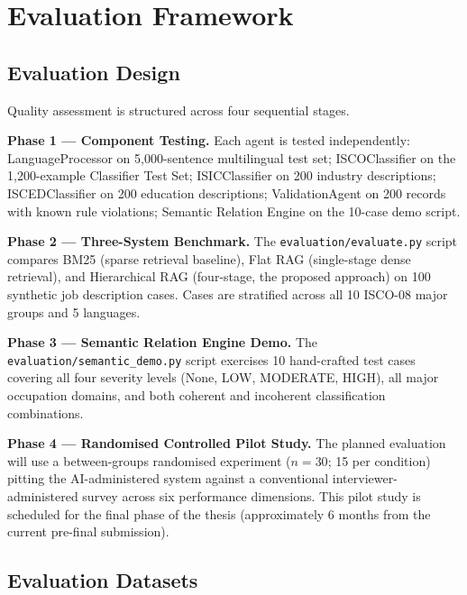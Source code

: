 \chapter{Evaluation Framework}
\label{chap:evaluation}

\section{Evaluation Design}
\label{sec:eval-design}

Quality assessment is structured across four sequential stages.

\textbf{Phase 1 --- Component Testing.}
Each agent is tested independently: LanguageProcessor on 5,000-sentence
multilingual test set; ISCOClassifier on the 1,200-example Classifier Test Set;
ISICClassifier on 200 industry descriptions; ISCEDClassifier on 200 education
descriptions; ValidationAgent on 200 records with known rule violations;
Semantic Relation Engine on the 10-case demo script.

\textbf{Phase 2 --- Three-System Benchmark.}
The \texttt{evaluation/evaluate.py} script compares BM25 (sparse retrieval
baseline), Flat RAG (single-stage dense retrieval), and Hierarchical RAG
(four-stage, the proposed approach) on 100 synthetic job description cases.
Cases are stratified across all 10 ISCO-08 major groups and 5 languages.

\textbf{Phase 3 --- Semantic Relation Engine Demo.}
The \texttt{evaluation/\-semantic\_\-demo.\-py} script exercises 10 hand-crafted
test cases covering all four severity levels (None, LOW, MODERATE, HIGH),
all major occupation domains, and both coherent and incoherent classification
combinations.

\textbf{Phase 4 --- Randomised Controlled Pilot Study.}
The planned evaluation will use a between-groups randomised experiment
($n=30$; 15 per condition) pitting the AI-administered system against a
conventional interviewer-administered survey across six performance dimensions.
This pilot study is scheduled for the final phase of the thesis (approximately
6 months from the current pre-final submission).

\section{Evaluation Datasets}
\label{sec:eval-datasets}

